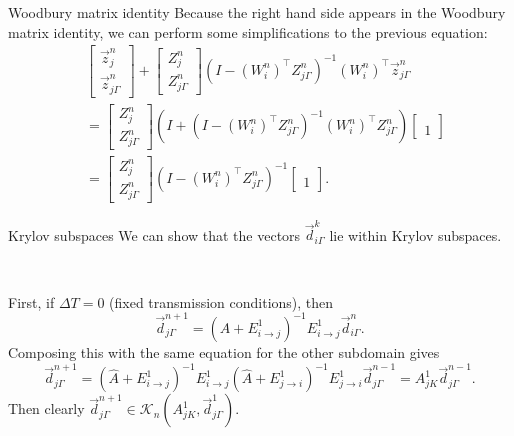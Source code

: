 \documentclass{beamer}
\begin{document}
\begin{frame}{Woodbury matrix identity}
Because the right hand side appears in the Woodbury matrix identity, we can perform some simplifications to the previous equation:
\begin{align*}
	& \begin{bmatrix} \vec{z}_j^n \\ \vec{z}_{j \Gamma}^n \end{bmatrix}
	+ \begin{bmatrix} Z_j^n \\ Z_{j \Gamma}^n \end{bmatrix}
	\left ( I - (W_i^n)^\top Z_{j \Gamma}^n \right )^{-1} (W_i^n)^\top \vec{z}_{j \Gamma}^n \\
	& = \begin{bmatrix} Z_j^n \\ Z_{j \Gamma}^n \end{bmatrix}
	\left ( I+	\left ( I - (W_i^n)^\top Z_{j \Gamma}^n \right )^{-1} (W_i^n)^\top Z_{j \Gamma}^n \right )
	\begin{bmatrix} ~ \\ 1 \end{bmatrix} \\
	& = \begin{bmatrix} Z_j^n \\ Z_{j \Gamma}^n \end{bmatrix}
	\left ( I - (W_i^n)^\top Z_{j \Gamma}^n \right )^{-1}
	\begin{bmatrix} ~ \\ 1 \end{bmatrix}.
\end{align*}
\end{frame}

\begin{frame}{Krylov subspaces}
We can show that the vectors $\vec{d}_{i \Gamma}^k$ lie within Krylov subspaces.

~

First, if $\Delta T=0$ (fixed transmission conditions), then
\begin{equation*}
	\vec{d}_{j \Gamma}^{n+1} = \left ( \hat{A} + E_{i \to j}^1 \right )^{-1} E_{i \to j}^1 \vec{d}_{i \Gamma}^{n}.
\end{equation*}
Composing this with the same equation for the other subdomain gives
\begin{equation*}
	\vec{d}_{j \Gamma}^{n+1} = \left ( \hat{A} + E_{i \to j}^1 \right )^{-1} E_{i \to j}^1 \left ( \hat{A} + E_{j \to i}^1 \right )^{-1} E_{j \to i}^1 \vec{d}_{j \Gamma}^{n-1}
		= A_{jK}^1 \vec{d}_{j \Gamma}^{n-1}.
\end{equation*}
Then clearly $\vec{d}_{j \Gamma}^{n+1} \in \mathcal{K}_n(A_{jK}^1, \vec{d}_{j \Gamma}^1)$.
\end{frame}
\end{document}
